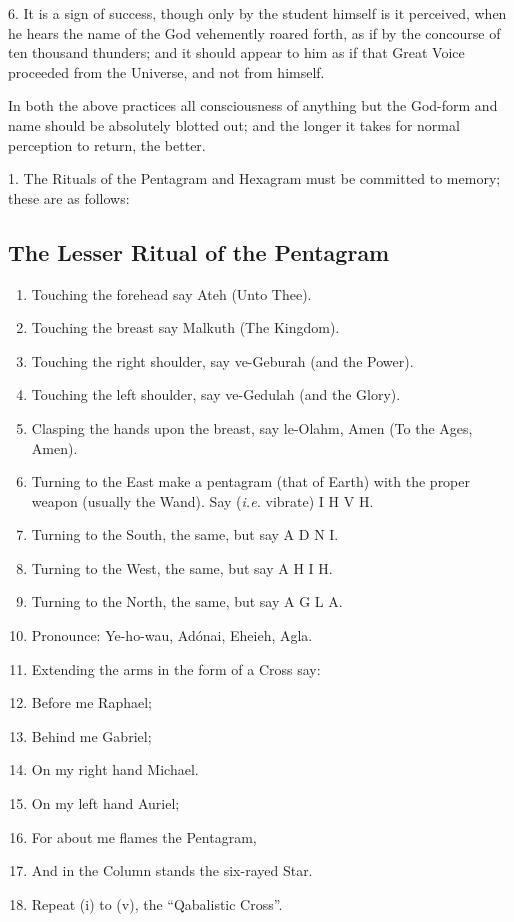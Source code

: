 6. It is a sign of success, though only by the student himself is it perceived, when he hears the name of the God vehemently roared forth, as if by the concourse of ten thousand thunders; and it should appear to him as if that Great Voice proceeded from the Universe, and not from himself.

In both the above practices all consciousness of anything but the God-form and name should be absolutely blotted out; and the longer it takes for normal perception to return, the better.



1. The Rituals of the Pentagram and Hexagram must be committed to memory; these are as follows:

\subsection*{The Lesser Ritual of the Pentagram}
\begin{enumerate}[label=(\Roman*)]
\item Touching the forehead say Ateh (Unto Thee).
\item Touching the breast say Malkuth (The Kingdom).
\item Touching the right shoulder, say ve-Geburah (and the Power).
\item Touching the left shoulder, say ve-Gedulah (and the Glory).
\item Clasping the hands upon the breast, say le-Olahm, Amen (To the Ages, Amen).
\item Turning to the East make a pentagram (that of Earth) with the proper weapon (usually the Wand). Say (\textit{i.e.} vibrate) \linebreak[2] I H V H.
\item Turning to the South, the same, but say \linebreak[2] A D N I.
\item Turning to the West, the same, but say \linebreak[2] A H I H.
\item Turning to the North, the same, but say \linebreak[2] A G L A.
\item[] Pronounce: Ye-ho-wau, Ad\'{o}nai, Eheieh, Agla.
\item Extending the arms in the form of a Cross say:
\item Before me Raphael;
\item Behind me Gabriel;
\item On my right hand Michael.
\item On my left hand Auriel;
\item For about me flames the Pentagram,
\item And in the Column stands the six-rayed Star.
\item[] Repeat (i) to (v), the \enquote{Qabalistic Cross}.
\end{enumerate}

